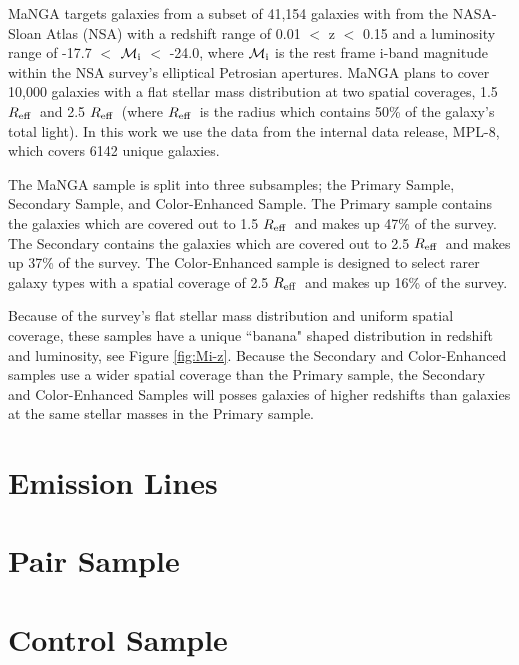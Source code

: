 \documentclass[iop,revtex4,twocolumn,apj,numberedappendix,appendixfloats]{emulateapj}
\newcommand{\reff}{$R_{\rm eff}$}
\begin{document}
MaNGA targets galaxies from a subset of 41,154 galaxies with from the NASA-Sloan Atlas (NSA) with a redshift range of 0.01 $<$ z $<$ 0.15 and a luminosity range of -17.7 $<$ $\mathcal{M_{\rm i}}$ $<$ -24.0, where $\mathcal{M_{\rm i}}$ is the rest frame i-band magnitude within the NSA survey's elliptical Petrosian apertures. MaNGA plans to cover 10,000 galaxies with a flat stellar mass distribution at two spatial coverages, 1.5 \reff\ and 2.5 \reff\ (where \reff\ is the radius which contains 50\% of the galaxy's total light). In this work we use the data from the internal data release, MPL-8, which covers 6142 unique galaxies. 

The MaNGA sample is split into three subsamples; the Primary Sample, Secondary Sample, and Color-Enhanced Sample. The Primary sample contains the galaxies which are covered out to 1.5 \reff\ and makes up 47\% of the survey. The Secondary contains the galaxies which are covered out to 2.5 \reff\ and makes up 37\% of the survey. The Color-Enhanced sample is designed to select rarer galaxy types with a spatial coverage of 2.5 \reff\ and makes up 16\% of the survey. 

Because of the survey's flat stellar mass distribution and uniform spatial coverage, these samples have a unique ``banana" shaped distribution in redshift and luminosity, see Figure \ref{fig:Mi-z}. Because the Secondary and Color-Enhanced samples use a wider spatial coverage than the Primary sample, the Secondary and Color-Enhanced Samples will posses galaxies of higher redshifts than galaxies at the same stellar masses in the Primary sample. 



\section{Emission Lines}\label{sec:analysis}


\section{Pair Sample}\label{sec:pair}


\section{Control Sample}\label{sec:control}
\end{document}

